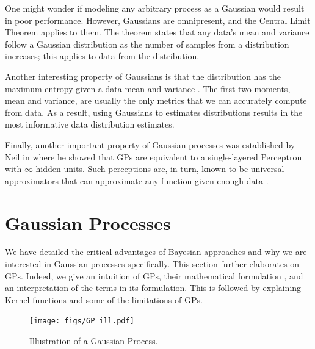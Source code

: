 \documentclass[letterpaper,11pt]{extarticle}
\begin{document}
One might wonder if modeling any arbitrary process as a Gaussian would result in poor performance. However, Gaussians are omnipresent, and the Central Limit Theorem applies to them. The theorem states that any data's mean and variance follow a Gaussian distribution as the number of samples from a distribution increases; this applies to data from the distribution. 

Another interesting property of Gaussians is that the distribution has the maximum entropy given a data mean and variance \cite{Murphy12}. The first two moments, mean and variance, are usually the only metrics that we can accurately compute from data. As a result, using Gaussians to estimates distributions results in the most informative data distribution estimates. 

Finally, another important property of Gaussian processes was established by Neil in \cite{Neal96} where he showed that GPs are equivalent to a single-layered Perceptron with $\infty$ hidden units. Such perceptions are, in turn, known to be universal approximators that can approximate any function given enough data \cite{HornikSW89}. 

\section{Gaussian Processes}
We have detailed the critical advantages of Bayesian approaches and why we are interested in Gaussian processes specifically. This section further elaborates on GPs. Indeed, we give an intuition of GPs, their mathematical formulation \cite{RasmussenW06, Murphy12}, and an interpretation of the terms in its formulation.  This is followed by explaining Kernel functions and some of the limitations of GPs. 

\begin{figure}[htp]
    \centering
    \texttt{[image: figs/GP\_ill.pdf]}
    \caption{Illustration of a Gaussian Process.}
    \label{fig:mnist_gp}
\end{figure}
\end{document}
